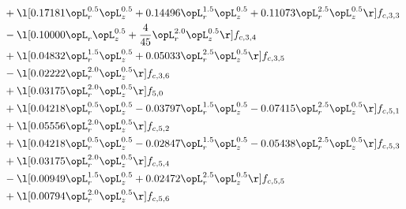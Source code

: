 \begin{alignat}{2}
& + \l[  0.17181 \opL_r^{0.5} \opL_z^{0.5} +  0.14496 \opL_r^{1.5} \opL_z^{0.5} +  0.11073 \opL_r^{2.5} \opL_z^{0.5}  \r] f_{c,3,3} \nonumber \\ 
& - \l[  0.10000 \opL_r \opL_z^{0.5} + \frac{4}{45} \opL_r^{2.0} \opL_z^{0.5}  \r] f_{c,3,4} \nonumber \\ 
& + \l[  0.04832 \opL_r^{1.5} \opL_z^{0.5} +  0.05033 \opL_r^{2.5} \opL_z^{0.5}  \r] f_{c,3,5} \nonumber \\ 
& - \l[  0.02222 \opL_r^{2.0} \opL_z^{0.5}  \r] f_{c,3,6} \nonumber \\ 
& + \l[  0.03175 \opL_r^{2.0} \opL_z^{0.5}  \r] f_{5,0} \nonumber \\ 
& + \l[  0.04218 \opL_r^{0.5} \opL_z^{0.5}   -0.03797 \opL_r^{1.5} \opL_z^{0.5}   -0.07415 \opL_r^{2.5} \opL_z^{0.5}  \r] f_{c,5,1} \nonumber \\ 
& + \l[  0.05556 \opL_r^{2.0} \opL_z^{0.5}  \r] f_{c,5,2} \nonumber \\ 
& + \l[  0.04218 \opL_r^{0.5} \opL_z^{0.5}   -0.02847 \opL_r^{1.5} \opL_z^{0.5}   -0.05438 \opL_r^{2.5} \opL_z^{0.5}  \r] f_{c,5,3} \nonumber \\ 
& + \l[  0.03175 \opL_r^{2.0} \opL_z^{0.5}  \r] f_{c,5,4} \nonumber \\ 
& - \l[  0.00949 \opL_r^{1.5} \opL_z^{0.5} +  0.02472 \opL_r^{2.5} \opL_z^{0.5}  \r] f_{c,5,5} \nonumber \\ 
& + \l[  0.00794 \opL_r^{2.0} \opL_z^{0.5}  \r] f_{c,5,6} \nonumber \\ 
\end{alignat} 


